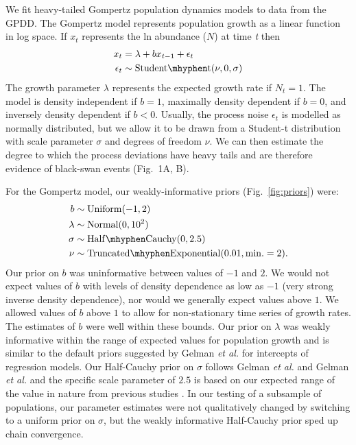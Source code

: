 We fit heavy-tailed Gompertz population dynamics models to data from the GPDD. The Gompertz model represents population growth as a linear function in log space. If \(x_{t}\) represents the ln abundance (\(N\)) at time \emph{t} then
\begin{align}
x_t &= \lambda + bx_{t - 1} + \epsilon_t\\
\epsilon_t &\sim \mathrm{Student\mhyphen t}(\nu, 0, \sigma)
\end{align}
The growth parameter \(\lambda\) represents the expected growth rate if \(N_{t}
= 1\). The model is density independent if \(b = 1\), maximally density
dependent if \(b = 0\), and inversely density dependent if \(b < 0\). Usually,
the process noise \(\epsilon_{t}\) is modelled as normally distributed, but we
allow it to be drawn from a Student-t distribution with scale parameter
\(\sigma\) and degrees of freedom \(\nu\). We can then estimate the degree to
which the process deviations have heavy tails and are therefore evidence of
black-swan events (Fig.~1A, B).

For the Gompertz model, our weakly-informative priors (Fig.~\ref{fig:priors}) were:
\begin{align}
b &\sim \mathrm{Uniform}(-1, 2)\\ \lambda &\sim \mathrm{Normal}(0, 10^2)\\
\sigma &\sim \mathrm{Half\mhyphen Cauchy} (0, 2.5)\\ \nu &\sim
\mathrm{Truncated\mhyphen Exponential}(0.01, \mathrm{min.} = 2).
\end{align}
Our prior on \(b\) was uninformative between values of \(-1\) and \(2\). We
would not expect values of \(b\) with levels of density dependence as low as
\(-1\) (very strong inverse density dependence), nor would we generally expect
values above \(1\). We allowed values of \(b\) above \(1\) to allow for
non-stationary time series of growth rates. The estimates of \(b\) were well
within these bounds. Our prior on \(\lambda\) was weakly informative within the
range of expected values for population growth and is similar to the default
priors suggested by Gelman \emph{et al.} \citep{gelman2008d} for intercepts of
regression models. Our Half-Cauchy prior on \(\sigma\) follows Gelman \emph{et
al.} \citep{gelman2006c} and Gelman \emph{et al.} \citep{gelman2008d} and the
specific scale parameter of \(2.5\) is based on our expected range of the value
in nature from previous studies \citep{connors2014}. In our testing of a
subsample of populations, our parameter estimates were not qualitatively
changed by switching to a uniform prior on \(\sigma\), but the weakly
informative Half-Cauchy prior sped up chain convergence.

